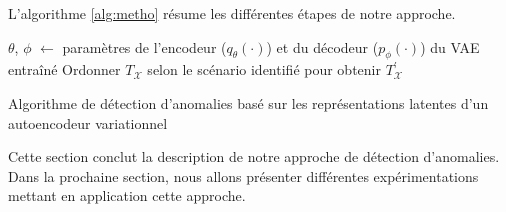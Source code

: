 L'algorithme \ref{alg:metho} résume les différentes étapes de notre approche.

\begin{center}
	\begin{algorithm}[H] \label{alg:metho}
		\SetAlgoLined
		$\theta$, $\phi$ $\leftarrow$ paramètres de l'encodeur ($q_{\theta}(\cdot)$) et du  décodeur ($p_{\phi}(\cdot)$) du VAE entraîné\;
		Ordonner $T_{\mathcal{X}}$ selon le scénario identifié pour obtenir $T^{'}_{\mathcal{X}}$ \;
		\caption{Algorithme de détection d'anomalies basé sur les représentations latentes d'un autoencodeur variationnel}
	\end{algorithm}
\end{center}

Cette section conclut la description de notre approche de détection d'anomalies. Dans la prochaine section, nous allons présenter différentes expérimentations mettant en application cette approche.
